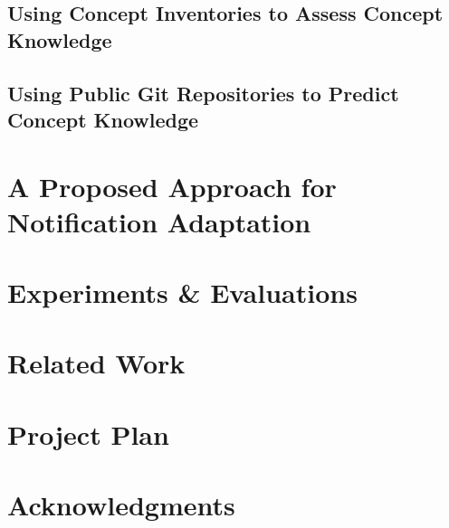 \documentclass{llncs}
\begin{document}
\subsection{Using Concept Inventories to Assess Concept Knowledge}


\subsection{Using Public Git Repositories to Predict Concept Knowledge}


\section{A Proposed Approach for Notification Adaptation}


\section{Experiments \& Evaluations}



\section{Related Work}


\section{Project Plan}


\section*{Acknowledgments}



\end{document}
